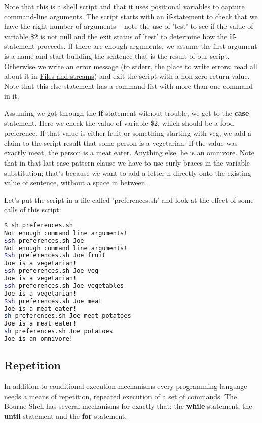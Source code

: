 Note that this is a shell script and that it uses positional variables to
capture command-line arguments. The script starts with an \textbf{if}-statement
to check that we have the right number of arguments -- note the use of 'test'
to see if the value of variable \$2 is not null and the exit status of 'test'
to determine how the \textbf{if}-statement proceeds. If there are enough
arguments, we assume the first argument is a name and start building the
sentence that is the result of our script. Otherwise we write an error message
(to stderr, the place to write errors; read all about it in
\href{http://en.wikibooks.org.org/wiki/Bourne_Shell_Scripting/Files_and_streams}{Files
and streams}) and exit the script with a non-zero return value. Note that this
else statement has a command list with more than one command in it.

Assuming we got through the \textbf{if}-statement without trouble, we get to
the \textbf{case}-statement. Here we check the value of variable \$2, which
should be a food preference. If that value is either fruit or something
starting with veg, we add a claim to the script result that some person is a
vegetarian. If the value was exactly meat, the person is a meat eater. Anything
else, he is an omnivore. Note that in that last case pattern clause we have to
use curly braces in the variable substitution; that's because we want to add a
letter n directly onto the existing value of sentence, without a space in
between.

Let's put the script in a file called 'preferences.sh' and look at the effect
of some calls of this script:

\lstset{basicstyle=\scriptsize, numbers=left, captionpos=b, tabsize=4}
\begin{lstlisting}[caption=Calling the script with different effects,language={bash},
breaklines=true,xleftmargin=15pt,label=lst:Calling the script with different effects]
$ sh preferences.sh
Not enough command line arguments!
$sh preferences.sh Joe
Not enough command line arguments!
$sh preferences.sh Joe fruit
Joe is a vegetarian!
$sh preferences.sh Joe veg
Joe is a vegetarian!
$sh preferences.sh Joe vegetables
Joe is a vegetarian!
$sh preferences.sh Joe meat
Joe is a meat eater!
sh preferences.sh Joe meat potatoes
Joe is a meat eater!
sh preferences.sh Joe potatoes
Joe is an omnivore!
\end{lstlisting}

\subsection{Repetition}
In addition to conditional execution mechanisms every programming language
needs a means of repetition, repeated execution of a set of commands. The
Bourne Shell has several mechanisms for exactly that: the
\textbf{while}-statement, the \textbf{until}-statement and the
\textbf{for}-statement.

